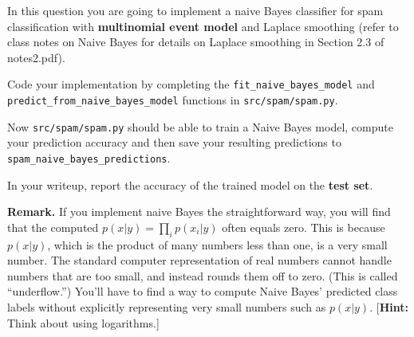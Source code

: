 \item {}
In this question you are going to implement a naive Bayes classifier for spam
classification with {\bf multinomial event model} and Laplace smoothing (refer to
class notes on Naive
Bayes for details on Laplace smoothing in Section 2.3 of notes2.pdf).

Code your implementation by completing the \texttt{fit\_naive\_bayes\_model}
and \\\texttt{predict\_from\_naive\_bayes\_model} functions in
\texttt{src/spam/spam.py}.

Now \texttt{src/spam/spam.py} should be able to train a Naive Bayes model,
compute your prediction accuracy and then save your resulting predictions
to \texttt{spam\_naive\_bayes\_predictions}.

In your writeup, report the accuracy of the trained model on the \textbf{test set}.

{\bf Remark.} If you implement naive Bayes the straightforward way, you will find
that the computed $p(x|y) = \prod_i p(x_i | y)$ often equals zero.  This is
because $p(x|y)$, which is the product of many numbers less than one, is a very
small  number. The standard computer representation of real numbers cannot
handle numbers that are too small, and instead rounds them off to zero.  (This
is called  ``underflow.'')  You'll have to find a way to compute Naive Bayes'
predicted  class labels without explicitly representing very small numbers such
as $p(x|y)$.
[\textbf{Hint:} Think about using logarithms.]

